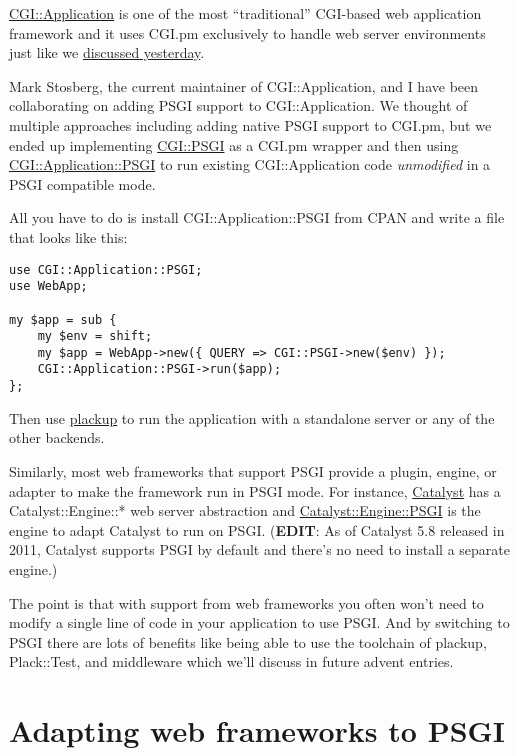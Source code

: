 \href{http://cgi-app.org/}{CGI::Application} is one of the most
``traditional'' CGI-based web application framework and it uses CGI.pm
exclusively to handle web server environments just like we
\href{http://advent.plackperl.org/2009/12/day-6-convert-cgi-apps-to-psgi.html}{discussed
yesterday}.

Mark Stosberg, the current maintainer of CGI::Application, and I have
been collaborating on adding PSGI support to CGI::Application. We
thought of multiple approaches including adding native PSGI support to
CGI.pm, but we ended up implementing
\href{http://search.cpan.org/perldoc?CGI::PSGI}{CGI::PSGI} as a CGI.pm
wrapper and then using
\href{http://search.cpan.org/perldoc?CGI::Application::PSGI}{CGI::Application::PSGI}
to run existing CGI::Application code \emph{unmodified} in a PSGI
compatible mode.

All you have to do is install CGI::Application::PSGI from CPAN and write
a  file that looks like this:

\begin{lstlisting}
use CGI::Application::PSGI;
use WebApp;

my $app = sub {
    my $env = shift;
    my $app = WebApp->new({ QUERY => CGI::PSGI->new($env) });
    CGI::Application::PSGI->run($app);
};
\end{lstlisting}

Then use
\href{http://advent.plackperl.org/2009/12/day-3-using-plackup.html}{plackup}
to run the application with a standalone server or any of the other
backends.

Similarly, most web frameworks that support PSGI provide a plugin,
engine, or adapter to make the framework run in PSGI mode. For instance,
\href{http://www.catalystframework.org/}{Catalyst} has a
Catalyst::Engine::* web server abstraction and
\href{http://search.cpan.org/perldoc?Catalyst::Engine::PSGI}{Catalyst::Engine::PSGI}
is the engine to adapt Catalyst to run on PSGI. (\textbf{EDIT}: As of
Catalyst 5.8 released in 2011, Catalyst supports PSGI by default and
there's no need to install a separate engine.)

The point is that with support from web frameworks you often won't need
to modify a single line of code in your application to use PSGI. And by
switching to PSGI there are lots of benefits like being able to use the
toolchain of plackup, Plack::Test, and middleware which we'll discuss in
future advent entries.

\chapter{Adapting web frameworks to
PSGI}\label{day-8-adapting-web-frameworks-to-psgi}

